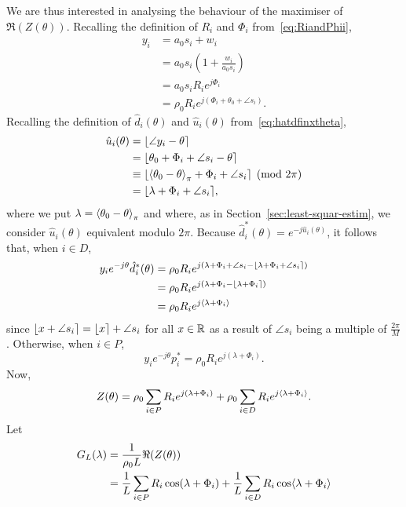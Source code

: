 \documentclass[journal]{IEEEtran}
\begin{document}
We are thus interested in analysing the behaviour of the maximiser of $\Re(Z(\theta))$.  Recalling the definition of $R_i$ and $\Phi_i$ from~\eqref{eq:RiandPhii},
\begin{align*}
y_i &= a_0 s_i + w_i \\
&= a_0 s_i \left( 1 + \frac{w_i}{a_0 s_i} \right) \\
&= a_0 s_i R_i e^{j \Phi_i} \\
&= \rho_0 R_i e^{j ( \Phi_i + \theta_0 + \angle{s_i}) }.
\end{align*}
Recalling the definition of $\hat{d}_i(\theta)$ and $\hat{u}_i(\theta)$ from~\eqref{eq:hatdfinxtheta},
\begin{align*}
\hat{u}_i(\theta) &= {\left\lfloor \angle{y_i} - \theta \right\rceil} \\
&= {\left\lfloor \theta_0 + \Phi_i + \angle{s_i} - \theta \right\rceil} \\
&\equiv {\left\lfloor  \left\langle \theta_0 - \theta \right\rangle_{\pi} + \Phi_i + \angle{s_i} \right\rceil} \pmod{2\pi} \\
&= {\left\lfloor  \lambda + \Phi_i + \angle{s_i}  \right\rceil},
\end{align*}
where we put $\lambda = \left\langle \theta_0 - \theta \right\rangle_\pi$ and where, as in Section~\ref{sec:least-squar-estim}, we consider $\hat{u}_i(\theta)$ equivalent modulo $2\pi$.  Because $\hat{d}_i^*(\theta) = e^{-j\hat{u}_i(\theta)}$, it follows that, when $i \in D$,
\begin{align}
 y_i e^{-j\theta} \hat{d}_i^*(\theta) &= \rho_0 R_i e^{j(\lambda + \Phi_i + \angle{s_i} - {\left\lfloor \lambda + \Phi_i + \angle{s_i} \right\rceil})} \nonumber \\
&= \rho_0 R_i e^{j(\lambda + \Phi_i - {\left\lfloor \lambda + \Phi_i \right\rceil})} \nonumber  \\
&= \rho_0 R_i e^{j\langle \lambda + \Phi_i \rangle} \label{eq:yethetadhat}
\end{align}
since ${\left\lfloor x + \angle{s_i} \right\rceil} = {\left\lfloor x \right\rceil} + \angle{s_i}$ for all $x \in {\mathbb R}$ as a result of $\angle{s_i}$ being a multiple of $\tfrac{2\pi}{M}$.  Otherwise, when $i \in P$,  
\[
y_i e^{-j\theta} p_i^* = \rho_0 R_i e^{j(\lambda + \Phi_i)}.
\]
Now,
\[
Z(\theta) = \rho_0 \sum_{i \in P} R_i e^{j(\lambda + \Phi_i)} + \rho_0  \sum_{i \in D} R_i e^{j\langle \lambda + \Phi_i \rangle}.
\]
Let 
\begin{align}
G_L(\lambda) &= \frac{1}{\rho_0 L} \Re(Z(\theta)) \label{eq:GLdefn} \\
&= \frac{1}{L} \sum_{i \in P} R_i \cos(\lambda + \Phi_i) + \frac{1}{L} \sum_{i \in D} R_i \cos\langle \lambda + \Phi_i \rangle \nonumber
\end{align}
\end{document}
